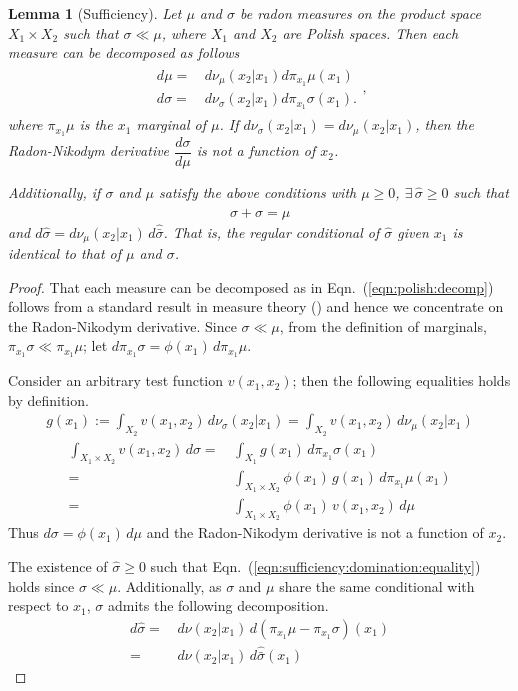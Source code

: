 \documentclass[dvipsnames]{article}
\newtheorem{lemma}{Lemma}
\begin{document}
\begin{lemma}[Sufficiency]
\label{lemma:sufficiency}
    Let $\mu$ and $\sigma$ be radon measures on the product space $X_1\times X_2$ such that $\sigma \ll \mu$, where $X_1$ and $X_2$ are Polish spaces. Then each measure can be decomposed as follows
    \begin{align}
    \begin{aligned}
        d\mu=&\,d\nu_{\mu}(x_2|x_1)d\pi_{x_1}\mu(x_1)\\
        d\sigma=&\,d\nu_{\sigma}(x_2|x_1)d\pi_{x_1}\sigma(x_1).
        \end{aligned},
        \label{eqn:polish:decomp}
    \end{align}
    where $\pi_{x_1}\mu$ is the $x_1$ marginal of $\mu$. If $d\nu_\sigma(x_2|x_1)=d\nu_{\mu}(x_2|x_1)$, then the Radon-Nikodym derivative $\dfrac{d\sigma}{d\mu}$ is not a function of $x_2$.
    \par
    Additionally, if $\sigma$ and $\mu$ satisfy the above conditions with $\mu\ge 0$, $\exists\, \hat\sigma\ge 0$ such that 
    \begin{align}
      \sigma+\hat\sigma=\mu\label{eqn:sufficiency:domination:equality}
    \end{align}
    and $d\hat\sigma=d\nu_\mu(x_2|x_1)\,d\hat{\bar\sigma}$. That is, the regular conditional of $\hat \sigma$ given $x_1$ is identical to that of $\mu$ and $\sigma$.
\end{lemma}
\begin{proof}
  That each measure can be decomposed as in Eqn.~(\ref{eqn:polish:decomp}) follows from a standard result in measure theory (\cite{bogachev_v2}) and hence we concentrate on the Radon-Nikodym derivative. Since $\sigma\ll \mu$, from the definition of marginals, $\pi_{x_1}\sigma\ll \pi_{x_1}\mu$; let $d\pi_{x_1}\sigma=\phi(x_1)\,d\pi_{x_1}\mu$.\par
  Consider an arbitrary test function $v(x_1,x_2)$; then the following equalities holds by definition.
  \begin{align*}
    g(x_1):=\int_{X_2}v(x_1,x_2)\,d\nu_{\sigma}(x_2|x_1)=\int_{X_2}v(x_1,x_2)\,d\nu_{\mu}(x_2|x_1)
  \end{align*}
  \begin{align*}
    \int_{X_1\times X_2} v(x_1,x_2)\,d\sigma=&\,\int_{X_1}g(x_1)\,d\pi_{x_1}\sigma(x_1)\\
    =&\,\int_{X_1\times X_2}\phi(x_1)\,g(x_1)\,d\pi_{x_1}\mu(x_1)\\
    =&\,\int_{X_1\times X_2} \phi(x_1)\,v(x_1,x_2)\,d\mu
  \end{align*}
  Thus $d\sigma=\phi(x_1)\,d\mu$ and the Radon-Nikodym derivative is not a function of $x_2$.
  \par
  The existence of $\hat\sigma \ge 0$ such that Eqn.~(\ref{eqn:sufficiency:domination:equality}) holds since $\sigma\ll\mu$. Additionally, as $\sigma$ and $\mu$ share the same conditional with respect to $x_1$, $\sigma$ admits the following decomposition.
  \begin{align*}
    d\hat \sigma=&\,d\nu(x_2|x_1)\,d(\pi_{x_1}\mu-\pi_{x_1}\sigma)(x_1)\\
    =&\,d\nu(x_2|x_1)\,d\hat{\bar\sigma}(x_1)
  \end{align*}
\end{proof}
\end{document}
